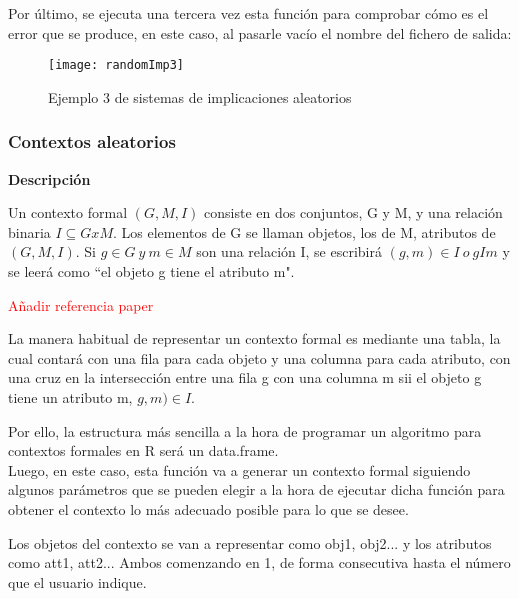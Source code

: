     \bigskip

    Por \'ultimo, se ejecuta una tercera vez esta funci\'on para comprobar c\'omo es el error que se produce, en este caso, al pasarle vac\'io 
    el nombre del fichero de salida:

    \begin{figure}[H]
        \centering
        \texttt{[image: randomImp3]}
        \caption{Ejemplo 3 de sistemas de implicaciones aleatorios}
        \label{fig:randomImp3}
    \end{figure}

    


    

\subsubsection{Contextos aleatorios}

    \textbf{Descripci\'on}

    Un contexto formal \( (G, M, I) \) consiste en dos conjuntos, G y M, y una relaci\'on binaria \( I \subseteq G x M \). Los elementos 
    de G se llaman objetos, los de M, atributos de \( (G, M, I) \). Si \(g \in G ~ y ~ m \in M \) son una relaci\'on I, se escribir\'a 
    \( (g,m) \in I ~ o ~ g I m \) y se leer\'a como ``el objeto g tiene el atributo m".

    \textcolor{red}{A\~nadir referencia paper}

    La manera habitual de representar un contexto formal es mediante una tabla, la cual contar\'a con una fila para cada objeto y una columna 
    para cada atributo, con una cruz en la intersecci\'on entre una fila g con una columna m sii el objeto g tiene un atributo m, \(g,m) \in 
    I \).

    Por ello, la estructura m\'as sencilla a la hora de programar un algoritmo para contextos formales en R ser\'a un data.frame.
    \\


    Luego, en este caso, esta funci\'on va a generar un contexto formal siguiendo algunos par\'ametros que se pueden elegir a la 
    hora de ejecutar dicha funci\'on para obtener el contexto lo m\'as adecuado posible para lo que se desee.

    Los objetos del contexto se van a representar como obj1, obj2... y los atributos como att1, att2... Ambos comenzando en 1, de forma 
    consecutiva hasta el n\'umero que el usuario indique.
    \\

